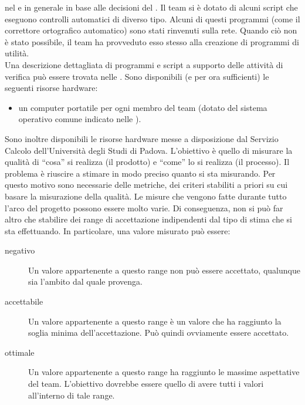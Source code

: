 					nel  e in generale in base alle decisioni del .
					Il team si è dotato di alcuni script che eseguono controlli automatici di diverso tipo. Alcuni di questi programmi (come il 
					correttore ortografico automatico) sono stati rinvenuti sulla rete. Quando ciò non è stato possibile, il team ha provveduto esso 
					stesso alla creazione di programmi di utilità.\\
					Una descrizione dettagliata di programmi e script a supporto delle attività di verifica può essere trovata nelle .
					Sono disponibili (e per ora sufficienti) le seguenti risorse hardware:
					\begin{itemize}
						\item un computer portatile per ogni membro del team (dotato del sistema operativo comune indicato nelle ).
					\end{itemize}
					Sono inoltre disponibili le risorse hardware messe a disposizione dal Servizio Calcolo dell'Università degli Studi di Padova.
		 \label{sec:metriche}
			L'obiettivo è quello di misurare la qualità di “cosa” si realizza (il prodotto) e “come” lo si realizza (il processo). Il problema è 
			riuscire a stimare in modo preciso quanto si sta misurando. Per questo motivo sono necessarie delle metriche, dei criteri stabiliti a 
			priori su cui basare la misurazione della qualità.
				Le misure che vengono fatte durante tutto l'arco del progetto possono essere molto varie. Di conseguenza, non si può far altro che 
				stabilire dei range di accettazione indipendenti dal tipo di stima che si sta effettuando. In particolare, una valore misurato può 
				essere:
				\begin{description}
					\item[negativo] Un valore appartenente a questo range non può essere accettato, qualunque sia l'ambito dal quale provenga.
					\item[accettabile] Un valore appartenente a questo range è un valore che ha raggiunto la soglia minima dell'accettazione. Può 
					quindi ovviamente essere accettato.
					\item[ottimale] Un valore appartenente a questo range ha raggiunto le massime aspettative del team. L'obiettivo dovrebbe essere 
					quello di avere tutti i valori all'interno di tale range.
				\end{description}
